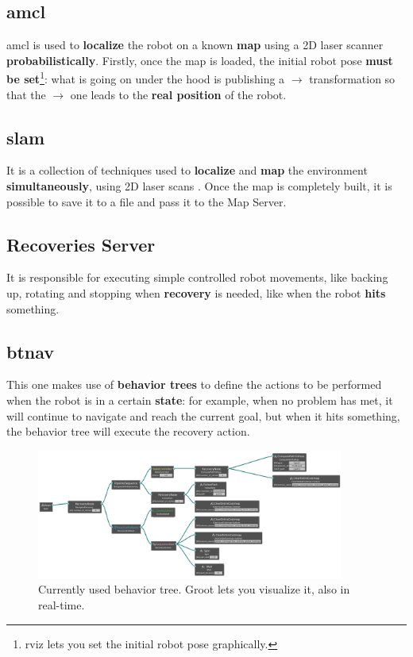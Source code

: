 \subsection*{\acrfull{amcl}}

\acrshort{amcl} is used to \textbf{localize} the robot on a known \textbf{map} using a 2D laser scanner \textbf{probabilistically}. Firstly, once the map is loaded, the initial robot pose \textbf{must be set}\footnote{\acrshort{rviz} lets you set the initial robot pose graphically.}: what is going on under the hood is publishing a  $\rightarrow$  transformation so that the  $\rightarrow$  one leads to the \textbf{real position} of the robot.

\subsection*{\acrfull{slam}}

It is a collection of techniques used to \textbf{localize} and \textbf{map} the environment \textbf{simultaneously}, using 2D laser scans \cite{slam}. Once the map is completely built, it is possible to save it to a file and pass it to the Map Server.

\subsection*{Recoveries Server}

It is responsible for executing simple controlled robot movements, like backing up, rotating and stopping when \textbf{recovery} is needed, like when the robot \textbf{hits} something.

\subsection*{\acrfull{btnav}}

This one makes use of \textbf{behavior trees} to define the actions to be performed when the robot is in a certain \textbf{state}: for example, when no problem has met, it will continue to navigate and reach the current goal, but when it hits something, the behavior tree will execute the recovery action.

\begin{figure}[h]
    \centering
    \includegraphics[width=0.9\textwidth]{images/bt-alpha.png}
    \caption{Currently used behavior tree. Groot lets you visualize it, also in real-time. \cite{groot}}
\end{figure}

